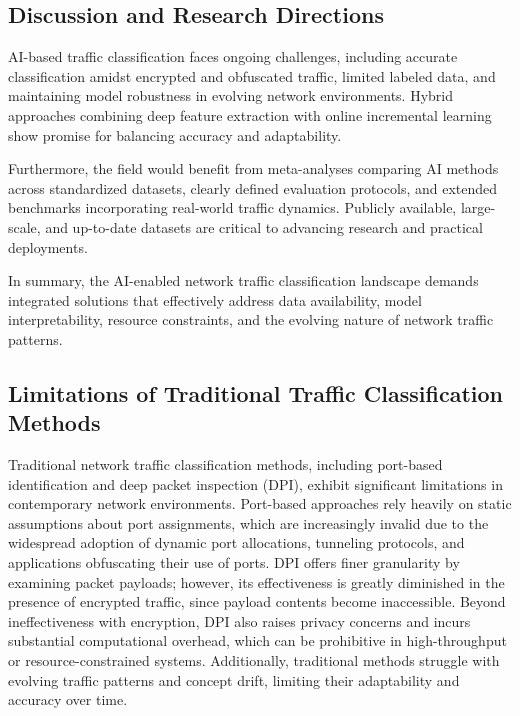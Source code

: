 \documentclass[sigconf]{acmart}
\begin{document}
\subsection{Discussion and Research Directions}

AI-based traffic classification faces ongoing challenges, including accurate classification amidst encrypted and obfuscated traffic, limited labeled data, and maintaining model robustness in evolving network environments. Hybrid approaches combining deep feature extraction with online incremental learning show promise for balancing accuracy and adaptability.

Furthermore, the field would benefit from meta-analyses comparing AI methods across standardized datasets, clearly defined evaluation protocols, and extended benchmarks incorporating real-world traffic dynamics. Publicly available, large-scale, and up-to-date datasets are critical to advancing research and practical deployments.

In summary, the AI-enabled network traffic classification landscape demands integrated solutions that effectively address data availability, model interpretability, resource constraints, and the evolving nature of network traffic patterns.

\subsection{Limitations of Traditional Traffic Classification Methods}

Traditional network traffic classification methods, including port-based identification and deep packet inspection (DPI), exhibit significant limitations in contemporary network environments. Port-based approaches rely heavily on static assumptions about port assignments, which are increasingly invalid due to the widespread adoption of dynamic port allocations, tunneling protocols, and applications obfuscating their use of ports. DPI offers finer granularity by examining packet payloads; however, its effectiveness is greatly diminished in the presence of encrypted traffic, since payload contents become inaccessible. Beyond ineffectiveness with encryption, DPI also raises privacy concerns and incurs substantial computational overhead, which can be prohibitive in high-throughput or resource-constrained systems. Additionally, traditional methods struggle with evolving traffic patterns and concept drift, limiting their adaptability and accuracy over time. 
\end{document}

